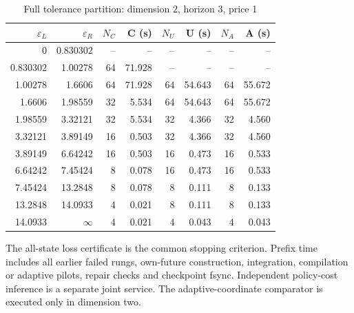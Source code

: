 \begin{table}[htbp]
\centering
\caption{Full tolerance partition: dimension 2, horizon 3, price 1}\label{tab:frontier-full48-2-3-1}
\footnotesize
\begin{tabular}{rrrrrrrr}
\toprule
$\varepsilon_L$ & $\varepsilon_R$ & $N_C$ & C (s) & $N_U$ & U (s) & $N_A$ & A (s)\\
\midrule
0 & 0.830302 & -- & -- & -- & -- & -- & -- \\
0.830302 & 1.00278 & 64 & 71.928 & -- & -- & -- & -- \\
1.00278 & 1.6606 & 64 & 71.928 & 64 & 54.643 & 64 & 55.672 \\
1.6606 & 1.98559 & 32 & 5.534 & 64 & 54.643 & 64 & 55.672 \\
1.98559 & 3.32121 & 32 & 5.534 & 32 & 4.366 & 32 & 4.560 \\
3.32121 & 3.89149 & 16 & 0.503 & 32 & 4.366 & 32 & 4.560 \\
3.89149 & 6.64242 & 16 & 0.503 & 16 & 0.473 & 16 & 0.533 \\
6.64242 & 7.45424 & 8 & 0.078 & 16 & 0.473 & 16 & 0.533 \\
7.45424 & 13.2848 & 8 & 0.078 & 8 & 0.111 & 8 & 0.133 \\
13.2848 & 14.0933 & 4 & 0.021 & 8 & 0.111 & 8 & 0.133 \\
14.0933 & $\infty$ & 4 & 0.021 & 4 & 0.043 & 4 & 0.043 \\
\bottomrule
\end{tabular}
\begin{minipage}{0.97\linewidth}\footnotesize\vspace{3pt}
The all-state loss certificate is the common stopping criterion. Prefix time includes all earlier failed rungs, own-future construction, integration, compilation or adaptive pilots, repair checks and checkpoint fsync. Independent policy-cost inference is a separate joint service. The adaptive-coordinate comparator is executed only in dimension two.
\end{minipage}
\end{table}
